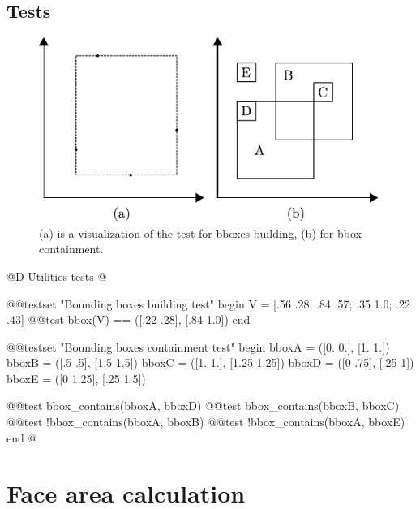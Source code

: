 \subsection{Tests}
\begin{figure}[h]
    \centering
    \includegraphics{./img/ch5-bboxes.pdf}
    \caption{(a) is a visualization of the test for bboxes building, (b) for bbox containment.}
\end{figure}
@D Utilities tests
@{@@testset "Bounding boxes building test" begin
    V = [.56 .28; .84 .57; .35  1.0; .22  .43]
    @@test bbox(V) == ([.22 .28], [.84 1.0])
end

@@testset "Bounding boxes containment test" begin
    bboxA = ([0. 0.], [1. 1.])
    bboxB = ([.5 .5], [1.5 1.5])
    bboxC = ([1. 1.], [1.25 1.25])
    bboxD = ([0 .75], [.25 1])
    bboxE = ([0 1.25], [.25 1.5])

    @@test bbox_contains(bboxA, bboxD)
    @@test bbox_contains(bboxB, bboxC)
    @@test !bbox_contains(bboxA, bboxB)
    @@test !bbox_contains(bboxA, bboxE)
end
@}

\section{Face area calculation}
\label{sec:face_area}

